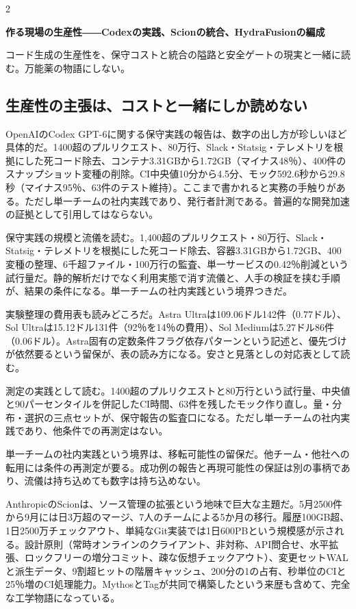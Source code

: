 \documentclass[lualatex,a4paper,10pt]{jlreq}
\begin{document}
\begin{multicols}{2}
{\Large\bfseries 作る現場の生産性――Codexの実践、Scionの統合、HydraFusionの編成\par}
\smallskip
{\color{SurveyMuted}コード生成の生産性を、保守コストと統合の隘路と安全ゲートの現実と一緒に読む。万能薬の物語にしない。\par}
\bigskip

\subsection*{生産性の主張は、コストと一緒にしか読めない}

OpenAIのCodex GPT-6に関する保守実践の報告は、数字の出し方が珍しいほど具体的だ。1400超のプルリクエスト、80万行、Slack・Statsig・テレメトリを根拠にした死コード除去、コンテナ3.31GBから1.72GB（マイナス48％）、400件のスナップショット変種の削除。CI中央値10分から4.5分、モック592.6秒から29.8秒（マイナス95％、63件のテスト維持）。ここまで書かれると実務の手触りがある。ただし単一チームの社内実践であり、発行者計測である。普遍的な開発加速の証拠として引用してはならない。
\cite{B31}


保守実践の規模と流儀を読む。1,400超のプルリクエスト・80万行、Slack・Statsig・テレメトリを根拠にした死コード除去、容器3.31GBから1.72GB、400変種の整理、6千超ファイル・100万行の監査、単一サービスの0.42％削減という試行量だ。静的解析だけでなく利用実態で消す流儀と、人手の検証を挟む手順が、結果の条件になる。単一チームの社内実践という境界つきだ。
\cite{B31}


実験整理の費用表も読みどころだ。Astra Ultraは109.06ドル142件（0.77ドル）、Sol Ultraは15.12ドル131件（92％を14％の費用）、Sol Mediumは5.27ドル86件（0.06ドル）。Astra固有の定数条件フラグ依存パターンという記述と、優先づけが依然要るという留保が、表の読み方になる。安さと見落としの対応表として読む。
\cite{B31}


測定の実践として読む。1400超のプルリクエストと80万行という試行量、中央値と90パーセンタイルを併記したCI時間、63件を残したモック作り直し。量・分布・選択の三点セットが、保守報告の監査口になる。ただし単一チームの社内実践であり、他条件での再測定はない。
\cite{B31}


単一チームの社内実践という境界は、移転可能性の留保だ。他チーム・他社への転用には条件の再測定が要る。成功例の報告と再現可能性の保証は別の事柄であり、流儀は持ち込めても数字は持ち込めない。
\cite{B31}


AnthropicのScionは、ソース管理の拡張という地味で巨大な主題だ。5月2500件から9月には日3万超のマージ、7人のチームによる5か月の移行。履歴100GB超、1日2500万チェックアウト、単純なGit実装では1日600PBという規模感が示される。設計原則（常時オンラインのクライアント、非対称、API問合せ、水平拡張、ロックフリーの増分コミット、疎な仮想チェックアウト）、変更セットWALと派生データ、9割超ヒットの階層キャッシュ、200分の1の占有、秒単位のCIと25％増のCI処理能力。MythosとTagが共同で構築したという来歴も含めて、完全な工学物語になっている。
\cite{B32,B75}



\end{multicols}
\end{document}
